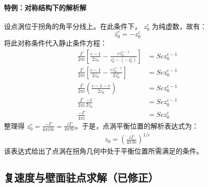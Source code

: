 \paragraph{特例：对称结构下的解析解}

设点涡位于拐角的角平分线上。在此条件下， $z_0^c$ 为纯虚数，故有：
\[
\boxed{ \bar{z}_0^c = -z_0^c }
\]
将此对称条件代入静止条件方程：
\begin{align*}
    \frac{\Gamma}{2\pi i} \left[ \frac{c-1}{2z_0} - \frac{c z_0^{c-1}}{z_0^c - (-z_0^c)} \right] &= S c z_0^{c-1} \\
    \frac{\Gamma}{2\pi i} \left[ \frac{c-1}{2z_0} - \frac{c z_0^{c-1}}{2z_0^c} \right] &= S c z_0^{c-1} \\
    \frac{\Gamma}{2\pi i} \left( \frac{c-1-c}{2z_0} \right) &= S c z_0^{c-1} \\
    \frac{\Gamma}{2\pi i} \frac{-1}{2z_0} &= S c z_0^{c-1} \\
    \frac{-\Gamma}{4\pi i} &= S c z_0^c
\end{align*}
整理得 $z_0^c = \frac{-\Gamma}{4\pi i S c} = \frac{i\Gamma}{4\pi S c}$。于是，点涡平衡位置的解析表达式为：
\begin{align}
    \boxed{
    z_0 = \left( \frac{i\Gamma}{4\pi S c} \right)^{1/c}
    }
\end{align}
该表达式给出了点涡在拐角几何中处于平衡位置所需满足的条件。

\subsection{复速度与壁面驻点求解（已修正）}

